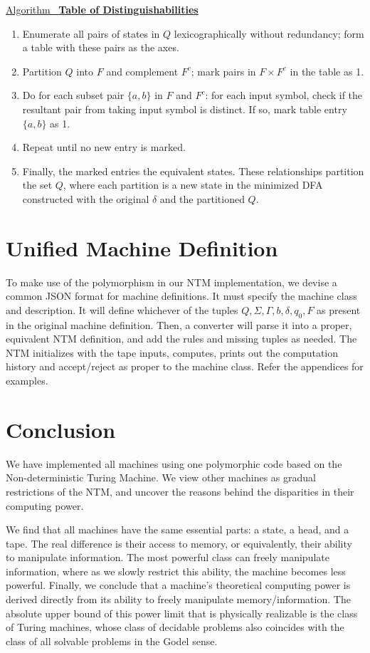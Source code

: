 \documentclass[12pt]{article}  %
\newcommand{\algtitle}[1]{\underline{Algorithm \ {\bf #1}} \vspace*{1mm}\\}
\begin{document}
\algtitle{Table of Distinguishabilities}
\begin{enumerate}
	\item Enumerate all pairs of states in $Q$ lexicographically without redundancy; form a table with these pairs as the axes.
	\item Partition $Q$ into $F$ and complement $F^c$; mark pairs in $F \times F^c$ in the table as 1.
	\item Do for each subset pair $\{a,b\}$ in $F$ and $F^c$:
	for each input symbol, check if the resultant pair from taking input symbol is distinct. If so, mark table entry $\{a,b\}$ as 1.
	\item Repeat until no new entry is marked.
	\item Finally, the marked entries the equivalent states. These relationships partition the set $Q$, where each partition is a new state in the minimized DFA constructed with the original $\delta$ and the partitioned $Q$.
\end{enumerate}





\section{Unified Machine Definition}
To make use of the polymorphism in our NTM implementation, we devise a common JSON format for machine definitions. It must specify the machine class and description. It will define whichever of the tuples $Q, \Sigma, \Gamma, b, \delta, q_0, F$ as present in the original machine definition. Then, a converter will parse it into a proper, equivalent NTM definition, and add the rules and missing tuples as needed. The NTM initializes with the tape inputs, computes, prints out the computation history and accept/reject as proper to the machine class. Refer the appendices for examples.



\section{Conclusion}
We have implemented all machines using one polymorphic code based on the Non-deterministic Turing Machine. We view other machines as gradual restrictions of the NTM, and uncover the reasons behind the disparities in their computing power. 

We find that all machines have the same essential parts: a state, a head, and a tape. The real difference is their access to memory, or equivalently, their ability to manipulate information. The most powerful class can freely manipulate information, where as we slowly restrict this ability, the machine becomes less powerful. Finally, we conclude that a machine's theoretical computing power is derived directly from its ability to freely manipulate memory/information. The absolute upper bound of this power limit that is physically realizable is the class of Turing machines, whose class of decidable problems also coincides with the class of all solvable problems in the Godel sense.
\end{document}
